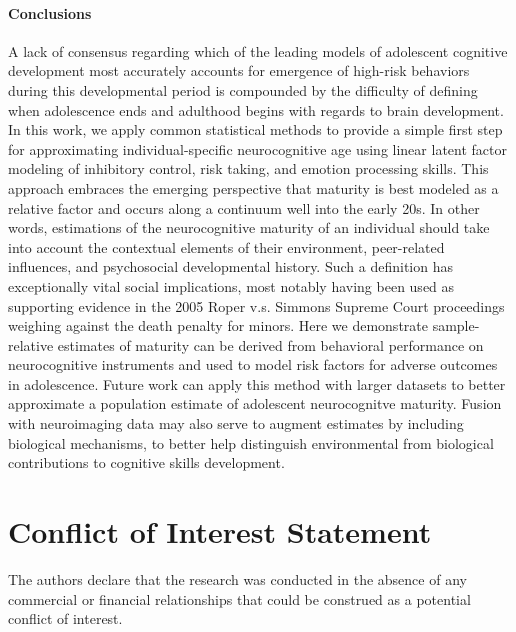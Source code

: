 \documentclass[utf8]{frontiersSCNS} %
\begin{document}
\paragraph*{Conclusions} A lack of consensus regarding which of the  leading models of adolescent cognitive development most accurately accounts for emergence of high-risk behaviors during this developmental period is compounded by the difficulty of defining when adolescence ends and adulthood begins with regards to brain development. In this work, we apply common statistical methods to provide a simple first step for approximating individual-specific neurocognitive age using linear latent factor modeling of inhibitory control, risk taking, and emotion processing skills. This approach embraces the emerging perspective that maturity is best modeled as a relative factor and occurs along a continuum well into the early 20s. In other words, estimations of the neurocognitive maturity of an individual should take into account the contextual elements of their environment, peer-related influences, and psychosocial developmental history. Such a definition has exceptionally vital social implications, most notably having been used as supporting evidence in the 2005 Roper v.s. Simmons Supreme Court proceedings weighing against the death penalty for minors. Here we demonstrate sample-relative estimates of maturity can be derived from behavioral performance on neurocognitive instruments and used to model risk factors for adverse outcomes in adolescence. Future work can apply this method with larger datasets to better approximate a population estimate of adolescent neurocognitve maturity. Fusion with neuroimaging data may also serve to augment estimates by including biological mechanisms, to better help distinguish environmental from biological contributions to cognitive skills development.




\section*{Conflict of Interest Statement}
The authors declare that the research was conducted in the absence of any commercial or financial relationships that could be construed as a potential conflict of interest.
\end{document}
